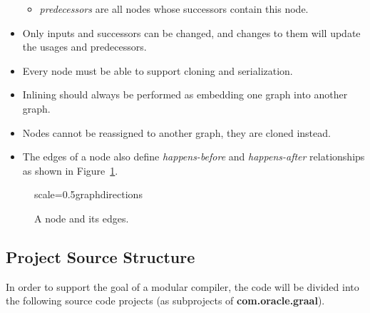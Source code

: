 \documentclass[twocolumn]{svjour3}
\begin{document}
\begin{itemize}
\begin{itemize}
        \item \emph{predecessors} are all nodes whose successors contain this node.
    \end{itemize}
    \item Only inputs and successors can be changed, and changes to them will update the usages and predecessors.
    \item Every node must be able to support cloning and serialization.
    \item Inlining should always be performed as embedding one graph into another graph.
    \item Nodes cannot be reassigned to another graph, they are cloned instead.
    \item The edges of a node also define \textit{happens-before} and \textit{happens-after} relationships as shown in Figure~\ref{fig:directions}.
\end{itemize}

\begin{figure}[h]
  \centering
\begin{digraphenv}{scale=0.5}{graphdirections}
\end{digraphenv}
  \caption{A node and its edges.}
  \label{fig:directions}
\end{figure}

\subsection{Project Source Structure}
In order to support the goal of a modular compiler, the code will be divided into the following source code projects (as subprojects of \textbf{com.oracle.graal}).
\end{document}
